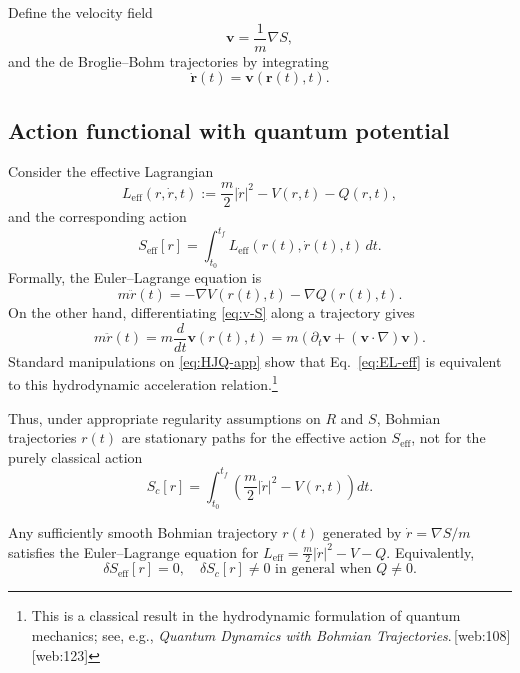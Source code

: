 \documentclass[11pt]{article}
\begin{document}
\begin{itemize}[leftmargin=*]
Define the velocity field
\begin{equation}
\mathbf{v} = \frac{1}{m}\nabla S,\label{eq:v-S}
\end{equation}
and the de Broglie--Bohm trajectories by integrating
\begin{equation}
\dot{\mathbf{r}}(t) = \mathbf{v}(\mathbf{r}(t),t).
\end{equation}

\subsection{Action functional with quantum potential}

Consider the effective Lagrangian
\[
L_{\text{eff}}(r,\dot r,t) := \frac{m}{2}|\dot r|^2 - V(r,t) - Q(r,t),
\]
and the corresponding action
\begin{equation}
S_{\text{eff}}[r] = \int_{t_0}^{t_f} L_{\text{eff}}(r(t),\dot r(t),t)\,dt.\label{eq:Seff}
\end{equation}
Formally, the Euler--Lagrange equation is
\begin{equation}
m\ddot r(t) = -\nabla V(r(t),t) - \nabla Q(r(t),t).\label{eq:EL-eff}
\end{equation}
On the other hand, differentiating \eqref{eq:v-S} along a trajectory gives
\begin{equation}
m\ddot r(t) = m\frac{d}{dt}\mathbf{v}(r(t),t)
= m\left(\partial_t \mathbf{v} + (\mathbf{v}\cdot\nabla)\mathbf{v}\right).
\end{equation}
Standard manipulations on \eqref{eq:HJQ-app} show that Eq.~\eqref{eq:EL-eff} is equivalent to this hydrodynamic acceleration relation.\footnote{This is a classical result in the hydrodynamic formulation of quantum mechanics; see, e.g., \emph{Quantum Dynamics with Bohmian Trajectories}.\,[web:108][web:123]}

Thus, under appropriate regularity assumptions on \(R\) and \(S\), Bohmian trajectories \(r(t)\) are stationary paths for the effective action \(S_{\text{eff}}\), not for the purely classical action
\[
S_c[r] = \int_{t_0}^{t_f}\left(\frac{m}{2}|\dot r|^2 - V(r,t)\right)dt.
\]

\begin{proposition}
Any sufficiently smooth Bohmian trajectory \(r(t)\) generated by \(\dot r = \nabla S/m\) satisfies the Euler--Lagrange equation for \(L_{\text{eff}} = \frac{m}{2}|\dot r|^2 - V - Q\).
Equivalently,
\[
\delta S_{\text{eff}}[r] = 0,\quad \delta S_c[r]\neq 0\text{ in general when }Q\neq 0.
\]
\end{proposition}


\end{itemize}
\end{document}
